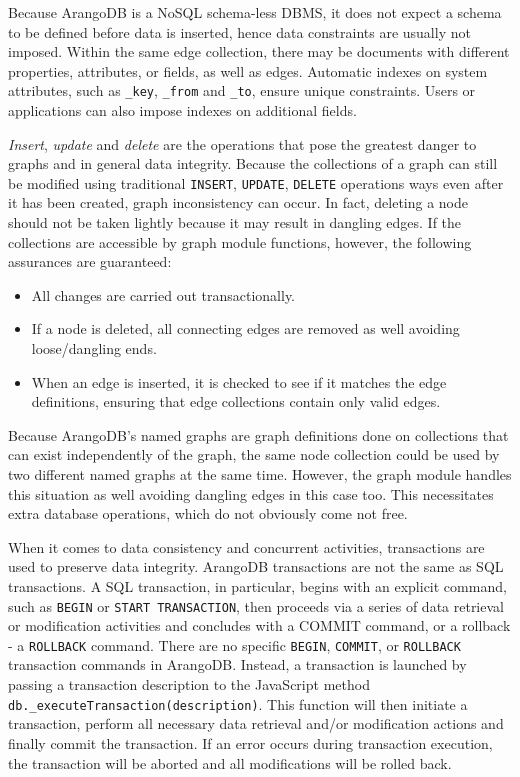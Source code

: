 Because ArangoDB is a NoSQL schema-less DBMS, it does not expect a schema to be defined before data is inserted, hence data constraints are usually not imposed.
Within the same edge collection, there may be documents with different properties, attributes, or fields, as well as edges.
Automatic indexes on system attributes, such as \texttt{\_key}, \texttt{\_from} and \texttt{\_to}, ensure unique constraints.
Users or applications can also impose indexes on additional fields.

\textit{Insert}, \textit{update} and \textit{delete} are the operations that pose the greatest danger to graphs and in general data integrity.
Because the collections of a graph can still be modified using traditional \texttt{INSERT}, \texttt{UPDATE}, \texttt{DELETE} operations ways even after it has been created, graph inconsistency can occur.
In fact, deleting a node should not be taken lightly because it may result in dangling edges.
If the collections are accessible by graph module functions, however, the following assurances are guaranteed:
 \begin{itemize}[noitemsep]
	\item All changes are carried out transactionally.
	\item If a node is deleted, all connecting edges are removed as well avoiding loose/dangling ends.
	\item When an edge is inserted, it is checked to see if it matches the edge definitions, ensuring that edge collections contain only valid edges.
\end{itemize}

Because ArangoDB's named graphs are graph definitions done on collections that can exist independently of the graph, the same node collection could be used by two different named graphs at the same time.
However, the graph module handles this situation as well avoiding dangling edges in this case too.
This necessitates extra database operations, which do not obviously come not free.

When it comes to data consistency and concurrent activities, transactions are used to preserve data integrity.
ArangoDB transactions are not the same as SQL transactions.
A SQL transaction, in particular, begins with an explicit command, such as \texttt{BEGIN} or \texttt{START TRANSACTION}, then proceeds via a series of data retrieval or modification activities and concludes with a COMMIT command, or a rollback - a \texttt{ROLLBACK} command.
There are no specific \texttt{BEGIN}, \texttt{COMMIT}, or \texttt{ROLLBACK} transaction commands in ArangoDB.
Instead, a transaction is launched by passing a transaction description to the JavaScript method \texttt{db.\_executeTransaction(description)}.
This function will then initiate a transaction, perform all necessary data retrieval and/or modification actions and finally commit the transaction.
If an error occurs during transaction execution, the transaction will be aborted and all modifications will be rolled back.

